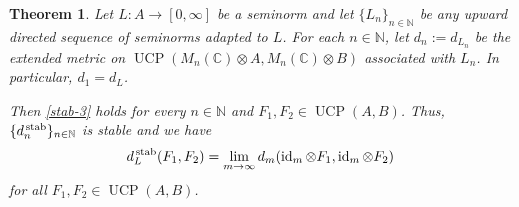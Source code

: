 \documentclass[11pt, a4paper, oneside, final, reqno]{amsart}
\newcommand{\bbN}{\mathbb{N}}
\newcommand{\bbC}{\mathbb{C}}
\newcommand{\UCP}{\operatorname{UCP}}
\newcommand{\id}{\operatorname{id}}
\theoremstyle{definition}
\theoremstyle{plain}
\newtheorem{theorem}[definition]{Theorem}
\theoremstyle{remark}
\numberwithin{equation}{section}
\begin{document}
\begin{theorem}\label{Ln2}
    Let $L \colon A \to [0, \infty]$ be a seminorm and let $\{L_n\}_{n\in \bbN}$ be any upward directed sequence of seminorms adapted to $L$. For each $n\in \bbN$, let $d_n:= d_{L_n}$ be the extended metric on $\UCP(M_n(\bbC)\otimes A, M_n(\bbC)\otimes B)$ associated with $L_n$. In particular, $d_1=d_L$.

    Then \eqref{stab-3} holds for every $n\in \bbN$ and $F_1, F_2 \in \UCP(A, B)$. Thus, $\{ d_n^{\, \rm stab}\}_{n\in \bbN}$ is stable and we have
    \begin{equation*}
        d_L^{\, \rm stab}(F_1, F_2) = \lim_{m\to \infty} d_{m}(\id_m\otimes F_1, \id_m\otimes F_2)
    \end{equation*}
    for all $F_1, F_2 \in \UCP(A, B)$.
\end{theorem}
\end{document}
